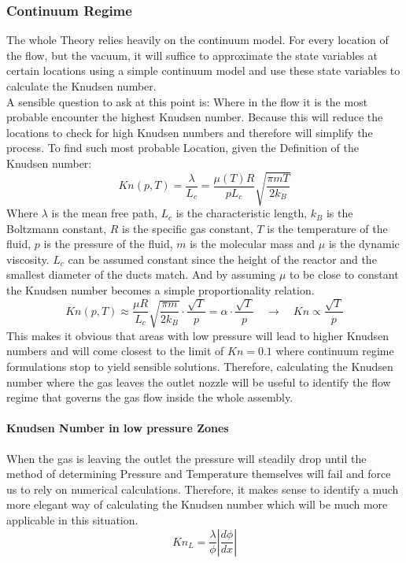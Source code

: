 \subsubsection{Continuum Regime}
	The whole Theory relies heavily on the continuum model.
	For every location of the flow, but the vacuum, it will suffice to approximate the state variables at certain locations using a simple continuum model and use these state variables to calculate the Knudsen number.\\
	A sensible question to ask at this point is: Where in the flow it is the most probable encounter the highest Knudsen number.
	Because this will reduce the locations to check for high Knudsen numbers and therefore will simplify the process.
	To find such most probable Location, given the Definition of the Knudsen number:
	$$
		Kn(p,T) = \frac{\lambda}{L_c} = \frac{\mu(T)R}{pL_c}\sqrt{\frac{\pi m T}{2k_B}}
	$$
	Where $\lambda$ is the mean free path, $L_c$ is the characteristic length, $k_B$ is the Boltzmann constant, $R$ is the specific gas constant, $T$ is the temperature of the fluid, $p$ is the pressure of the fluid, $m$ is the molecular mass and $\mu$ is the dynamic viscosity.
	$L_c$ can be assumed constant since the height of the reactor and the smallest diameter of the ducts match.
	And by assuming $\mu$ to be close to constant the Knudsen number becomes a simple proportionality relation.
	$$
		Kn(p,T)\approx\frac{\mu R}{L_c}\sqrt{\frac{\pi m}{2k_B}}\cdot\frac{\sqrt{T}}{p}=\alpha\cdot\frac{\sqrt{T}}{p}\quad\rightarrow\quad Kn\propto \frac{\sqrt{T}}{p}
	$$
	This makes it obvious that areas with low pressure will lead to higher Knudsen numbers and will come closest to the limit of $Kn=0.1$ where continuum regime formulations stop to yield sensible solutions.
	Therefore, calculating the Knudsen number where the gas leaves the outlet nozzle will be useful to identify the flow regime that governs the gas flow inside the whole assembly.

\paragraph{Knudsen Number in low pressure Zones}

	When the gas is leaving the outlet the pressure will steadily drop until the method of determining Pressure and Temperature themselves will fail and force us to rely on numerical calculations.
	Therefore, it makes sense to identify a much more elegant way of calculating the Knudsen number which will be much more applicable in this situation.
	$$
		K n_L = \frac{\lambda}{\phi} \left| \frac{d\phi}{dx} \right|
	$$
\newpage

